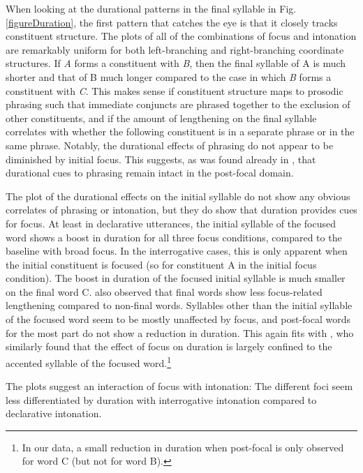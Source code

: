 \documentclass[preprint,review,12pt,authoryear,times]{elsarticle}
\begin{document}
When looking at the durational patterns in the final syllable in Fig. \ref{figureDuration}, the first pattern that catches the eye is that it closely tracks constituent structure. The plots of all of the combinations of focus and intonation are remarkably uniform for both left-branching and right-branching coordinate structures. If {\em A} forms a constituent with {\em B}, then the final syllable of A is much shorter and that of B much longer compared to the case in which {\em B} forms a constituent with {\em C}.  This makes sense if constituent structure maps to prosodic phrasing such that immediate conjuncts are phrased together to the exclusion of other constituents, and if the amount of lengthening on the final syllable correlates with whether the following constituent is in a separate phrase or in the same phrase. Notably, the durational effects of phrasing do not appear to be diminished by initial focus. This suggests, as was found already in \citet{norcl05}, that durational cues to phrasing remain intact in the post-focal domain. 

The plot of the durational effects on the initial syllable do not show any obvious correlates of phrasing or intonation, but they do show that duration provides cues for focus. At least in declarative utterances, the initial syllable of the focused word shows a boost in duration for all three focus conditions, compared to the baseline with broad focus. In the interrogative cases, this is only apparent when the initial constituent is focused (so for constituent A in the initial focus condition). The boost in duration of the focused initial syllable is much smaller on the final word C. \citet{coope85} also observed that final words show less focus-related lengthening compared to non-final words. Syllables other than the initial syllable of the focused word seem to be mostly unaffected by focus, and post-focal words for the most part do not show a reduction in duration. This again fits with \citet{coope85}, who similarly found that the effect of focus on duration is largely confined to the accented syllable of the focused word.\footnote{In our data, a small reduction in duration when post-focal is only observed for word C (but not for word B).} 

The plots suggest an interaction of focus with intonation: The different foci seem less differentiated by duration with interrogative intonation compared to declarative intonation. 
\end{document}
